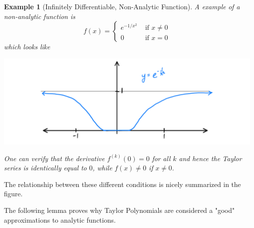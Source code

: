 \documentclass{article}
\newtheorem{example}{Example}[section]
\theoremstyle{remark}
\theoremstyle{definition}
\begin{document}
\begin{example}[Infinitely Differentiable, Non-Analytic Function]
A example of a non-analytic function is
\[f(x) = \begin{cases}
e^{-1/x^2} & \text{ if } x \neq 0 \\
0 & \text{ if } x = 0
\end{cases}\]
which looks like
\begin{center}
    \includegraphics[scale=0.25]{img/Infinitely_Differentiable_Non_Analytic_Function.PNG}
\end{center}
One can verify that the derivative $f^{(k)} (0) = 0$ for all $k$ and hence the Taylor series is identically equal to $0$, while $f(x) \neq 0$ if $x \neq 0$. 
\end{example}

The relationship between these different conditions is nicely summarized in the figure. 
\begin{center}
\end{center}

The following lemma proves why Taylor Polynomials are considered a "good" approximations to analytic functions. 
\end{document}
